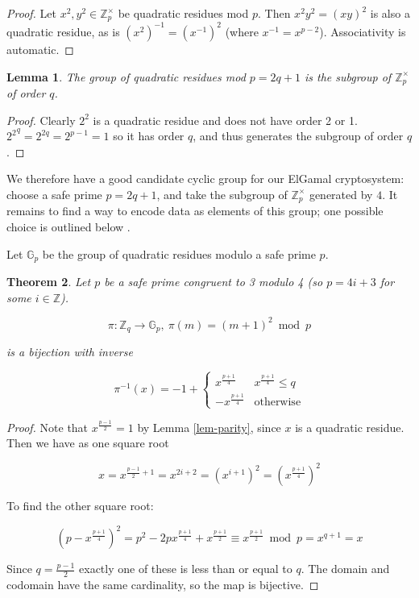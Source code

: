 \documentclass[11pt,twoside,a4paper]{article}
\newtheorem{theorem}{Theorem}[section]
\newtheorem{lemma}[theorem]{Lemma}
\theoremstyle{definition}
\begin{document}
\begin{proof}
    Let \(x^2,y^2\in\mathbb{Z}^\times_p\) be quadratic residues mod \(p\). Then \(x^2y^2=(xy)^2\) is also a quadratic residue, as is \((x^2)^{-1}=(x^{-1})^2\) (where \(x^{-1}=x^{p-2}\)). Associativity is automatic.
\end{proof}
\begin{lemma}
    The group of quadratic residues mod \(p=2q+1\) is the subgroup of \(\mathbb{Z}^\times_p\) of order \(q\).
\end{lemma}
\begin{proof}
    Clearly \(2^2\) is a quadratic residue and does not have order 2 or 1. \({2^2}^q=2^{2q}=2^{p-1}=1\) so it has order \(q\), and thus generates the subgroup of order \(q\).
\end{proof}
We therefore have a good candidate cyclic group for our ElGamal cryptosystem: choose a safe prime \(p=2q+1\), and take the subgroup of \(\mathbb{Z}^\times_p\) generated by \(4\). It remains to find a way to encode data as elements of this group; one possible choice is outlined below \cite{katz2014introduction}.

Let \(\mathbb{G}_p\) be the group of quadratic residues modulo a safe prime \(p\).
\begin{theorem}
    Let \(p\) be a safe prime congruent to 3 modulo 4 (so \(p=4i+3\) for some \(i\in\mathbb{Z}\)).

    \[\pi:\mathbb{Z}_q\rightarrow\mathbb{G}_p,\ \pi(m)=(m+1)^2\bmod p\]

    is a bijection with inverse

    \[\pi^{-1}(x)=-1+\begin{cases}
        x^\frac{p+1}{4} & x^\frac{p+1}{4}\leq q\\
        -x^\frac{p+1}{4}&\text{otherwise}
    \end{cases}\]

\end{theorem}
\begin{proof}
    Note that \(x^\frac{p-1}{2}=1\) by Lemma \ref{lem-parity}, since \(x\) is a quadratic residue. Then we have as one square root

    \[x=x^{\frac{p-1}{2}+1}=x^{2i+2}=(x^{i+1})^2=\left(x^\frac{p+1}{4}\right)^2\]

    To find the other square root:

    \[\left(p-x^\frac{p+1}{4}\right)^2=p^2-2px^\frac{p+1}{4}+x^\frac{p+1}{2}\equiv x^\frac{p+1}{2}\bmod p=x^{q+1}=x\]

    Since \(q=\frac{p-1}{2}\) exactly one of these is less than or equal to \(q\). The domain and codomain have the same cardinality, so the map is bijective.



\end{proof}
\end{document}
